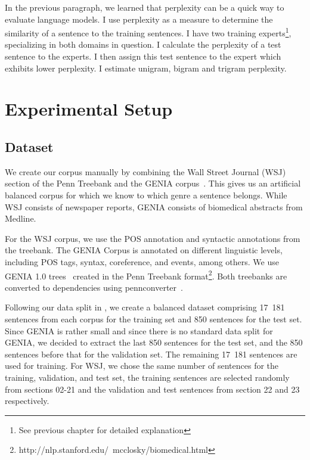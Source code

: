 In the previous paragraph, we learned that perplexity can be a quick way to evaluate language models. I use perplexity as a measure to determine the similarity of a sentence to the training sentences. I have two training experts\footnote{See previous chapter for detailed explanation}, specializing in both domains in question. I calculate the perplexity of a test sentence to the experts. I then assign this test sentence to the expert which exhibits lower perplexity. I estimate unigram, bigram and trigram perplexity. 



\section{Experimental Setup} \label{exptsetup}

\subsection{Dataset}

We create our corpus manually by combining the Wall Street Journal (WSJ)~\cite{marcus:kim:ea:94} section of the Penn Treebank and the GENIA corpus~\cite{tateisi:tsujii:04}. This gives us an artificial balanced corpus for which we know to which genre a sentence belongs.  While WSJ consists of newspaper reports, GENIA consists of biomedical abstracts from Medline.


For the WSJ corpus, we use the POS annotation and syntactic annotations  from the treebank. The GENIA Corpus is annotated on different linguistic levels, including POS tags, syntax, coreference, and events, among others. We use GENIA 1.0 trees~\cite{Ohta:2002:GCA:1289189.1289260} created in the Penn Treebank format\footnote{http://nlp.stanford.edu/~mcclosky/biomedical.html}. Both treebanks are converted to dependencies using pennconverter~\cite{johansson2007a}.

Following our data split in , we create a balanced dataset comprising 17~181 sentences from each corpus for the training set and 850 sentences for the test set. Since GENIA is rather small and since there is no standard data split for GENIA, we decided to extract the last 850 sentences for the test set, and the 850 sentences before that for the validation set. The remaining 17~181 sentences are used for training. For WSJ, we chose the same number of sentences for the training, validation,  and test set, the training sentences are selected randomly from sections 02-21 and the validation and test sentences from section 22 and 23 respectively.


